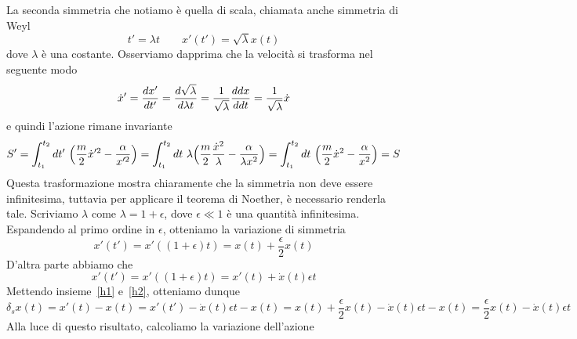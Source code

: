 \begin{example}
        \hfill

        La seconda simmetria che notiamo è quella di scala, chiamata anche simmetria di Weyl
    \begin{equation*}
        t' = \lambda t \qquad x'(t') = \sqrt{\lambda} x(t)
    \end{equation*} 
        dove $\lambda$ è una costante. Osserviamo dapprima che la velocità si trasforma nel seguente modo
    \begin{equation*}
        \dot x' = \frac{dx'}{dt'} = \frac{d\sqrt{\lambda}}{d\lambda t} = \frac{1}{\sqrt{\lambda}} \frac{ddx}{ddt} = \frac{1}{\sqrt{\lambda}} \dot x
    \end{equation*} 
        e quindi l'azione rimane invariante
    \begin{equation*}
        S' = \int_{t_1}^{t_2}dt'~ \Big( \frac{m}{2} \dot x'^2 - \frac{\alpha}{x'^2} \Big) = \int_{t_1}^{t_2}dt~ \lambda \Big( \frac{m}{2} \frac{\dot x^2}{\lambda} - \frac{\alpha}{\lambda x^2} \Big) = \int_{t_1}^{t_2}dt~ \Big( \frac{m}{2} \dot x^2 - \frac{\alpha}{x^2} \Big) = S
    \end{equation*}
        Questa trasformazione mostra chiaramente che la simmetria non deve essere infinitesima, tuttavia per applicare il teorema di Noether, è necessario renderla tale. Scriviamo $\lambda$ come $\lambda = 1 + \epsilon$, dove $\epsilon \ll 1$ è una quantità infinitesima. Espandendo al primo ordine in $\epsilon$, otteniamo la variazione di simmetria
    \begin{equation} \label{h1}
        x'(t') = x'((1+\epsilon)t) = x(t) + \frac{\epsilon}{2} x(t)
    \end{equation}
        D'altra parte abbiamo che 
    \begin{equation} \label{h2}
        x'(t') = x'((1+\epsilon)t) = x'(t) + \dot x(t) \epsilon t
    \end{equation}
        Mettendo insieme~\eqref{h1} e~\eqref{h2}, otteniamo dunque
    \begin{equation*}
        \delta_s x(t) = x'(t) - x(t) = x'(t') - \dot x(t) \epsilon t - x(t) = x(t) + \frac{\epsilon}{2} x(t) - \dot x(t) \epsilon t - x(t) = \frac{\epsilon}{2} x(t) - \dot x(t) \epsilon t 
    \end{equation*}
        Alla luce di questo risultato, calcoliamo la variazione dell'azione
    \begin{equation}
    \begin{aligned}

\end{aligned}
\end{equation}
\end{example}
